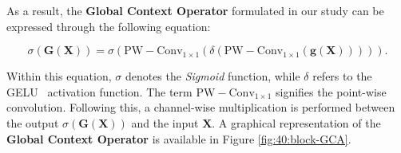 As a result, the \textbf{Global Context Operator} formulated in our study can be expressed through the following equation:

\begin{equation}
\sigma\left(\mathbf{G}(\mathbf{X})\right) = \sigma\left(\operatorname{PW-Conv_{1\times 1}}\left(\delta\left(\operatorname{PW-Conv_{1\times 1}}(\mathbf{g}(\mathbf{X}))\right)\right)\right). \label{eq:block-GCA}
\end{equation}

Within this equation, \( \sigma \) denotes the \textit{Sigmoid} function, while \( \delta \) refers to the GELU~\cite{hendrycks2023gaussian} activation function. The term \( \operatorname{PW-Conv_{1\times 1}} \) signifies the point-wise convolution. Following this, a channel-wise multiplication is performed between the output \( \sigma\left(\mathbf{G}(\mathbf{X})\right) \) and the input \( \mathbf{X} \). A graphical representation of the \textbf{Global Context Operator} is available in Figure \ref{fig:40:block-GCA}.

